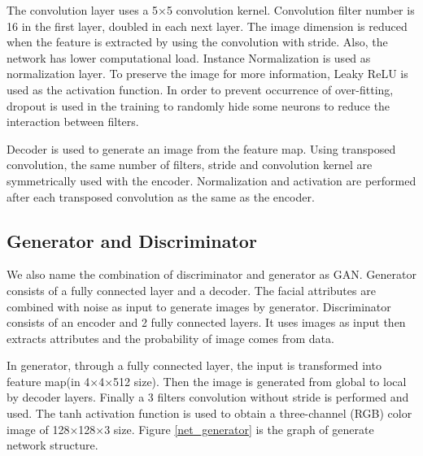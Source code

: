 The convolution layer uses a 5×5 convolution kernel.
Convolution filter number is 16 in the first layer, doubled in each next layer.
The image dimension is reduced when the feature is extracted by using the convolution with stride.
Also, the network has lower computational load.
Instance Normalization is used as normalization layer.
To preserve the image for more information, Leaky ReLU is used as the activation function.
In order to prevent occurrence of over-fitting,
    dropout is used in the training to randomly hide some neurons to reduce the interaction between filters.

Decoder is used to generate an image from the feature map.
Using transposed convolution, the same number of filters,
    stride and convolution kernel are symmetrically used with the encoder.
Normalization and activation are performed after each transposed convolution as the same as the encoder.

\subsection{Generator and Discriminator}

We also name the combination of discriminator and generator as GAN.
Generator consists of a fully connected layer and a decoder.
The facial attributes are combined with noise as input to generate images by generator.
Discriminator consists of an encoder and 2 fully connected layers.
It uses images as input then extracts attributes and the probability of image comes from data.


In generator, through a fully connected layer, the input is transformed into feature map(in 4×4×512 size).
Then the image is generated from global to local by decoder layers.
Finally a 3 filters convolution without stride is performed and used.
The tanh activation function is used to obtain a three-channel (RGB) color image of 128×128×3 size.
Figure \ref{net_generator} is the graph of generate network structure.

